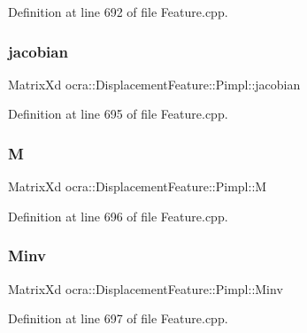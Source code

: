Definition at line 692 of file Feature.\+cpp.

\hypertarget{structocra_1_1DisplacementFeature_1_1Pimpl_a1dd31262d5e3fcec9850a03324754a8f}{}\label{structocra_1_1DisplacementFeature_1_1Pimpl_a1dd31262d5e3fcec9850a03324754a8f} 
\subsubsection{\texorpdfstring{jacobian}{jacobian}}
{\footnotesize\ttfamily Matrix\+Xd ocra\+::\+Displacement\+Feature\+::\+Pimpl\+::jacobian}



Definition at line 695 of file Feature.\+cpp.

\hypertarget{structocra_1_1DisplacementFeature_1_1Pimpl_ac656f6c1eb52377b1d313820f4a448d4}{}\label{structocra_1_1DisplacementFeature_1_1Pimpl_ac656f6c1eb52377b1d313820f4a448d4} 
\subsubsection{\texorpdfstring{M}{M}}
{\footnotesize\ttfamily Matrix\+Xd ocra\+::\+Displacement\+Feature\+::\+Pimpl\+::M}



Definition at line 696 of file Feature.\+cpp.

\hypertarget{structocra_1_1DisplacementFeature_1_1Pimpl_a9fc763f2f433156e2df5a239a64e5514}{}\label{structocra_1_1DisplacementFeature_1_1Pimpl_a9fc763f2f433156e2df5a239a64e5514} 
\subsubsection{\texorpdfstring{Minv}{Minv}}
{\footnotesize\ttfamily Matrix\+Xd ocra\+::\+Displacement\+Feature\+::\+Pimpl\+::\+Minv}



Definition at line 697 of file Feature.\+cpp.


